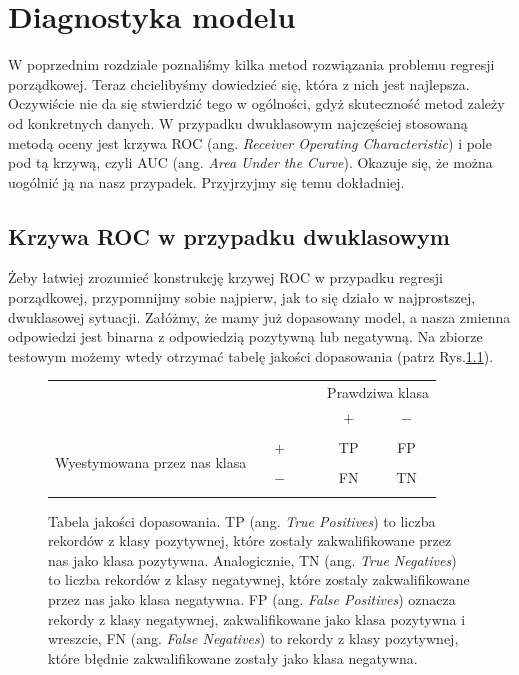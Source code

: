 \documentclass{mini}
\begin{document}

\chapter{Diagnostyka modelu}

W poprzednim rozdziale poznaliśmy kilka metod rozwiązania problemu regresji porządkowej. Teraz chcielibyśmy dowiedzieć się, która z nich jest najlepsza. Oczywiście nie da się stwierdzić tego w ogólności, gdyż skuteczność metod zależy od konkretnych danych. W przypadku dwuklasowym najczęściej stosowaną metodą oceny jest krzywa ROC (ang. \textit{Receiver Operating Characteristic}) i pole pod tą krzywą, czyli AUC (ang. \textit{Area Under the Curve}). Okazuje się, że można uogólnić ją na nasz przypadek. Przyjrzyjmy się temu dokładniej. 

\section{Krzywa ROC w przypadku dwuklasowym}


Żeby łatwiej zrozumieć konstrukcję krzywej ROC w przypadku regresji porządkowej, przypomnijmy sobie najpierw, jak to się działo w najprostszej, dwuklasowej sytuacji. Załóżmy, że mamy już dopasowany model, a nasza zmienna odpowiedzi jest binarna z odpowiedzią pozytywną lub negatywną. Na zbiorze testowym możemy wtedy otrzymać tabelę jakości dopasowania (patrz Rys.\ref{tabeladopasowania}).

\begin{figure}[h]
		\begin{Large}
		\begin{center}
		\begin{tabular}{c c c c | | c c c} 
			& & & & & \multicolumn{2}{c}{\Large Prawdziwa klasa}\\ 
			& & & & & $+$ & $-$ \\
			\hline
			\hline
			& & & & & & \\
			\multirow{3}{*}{\parbox{4cm}{\centering \Large Wyestymowana przez nas klasa}}
			& & $+$ & & & TP & FP\\
			& & & & &\\
			& & $-$ & & & FN & TN\\
			& & & & & &
		\end{tabular}
		\end{center}
		\end{Large}
	\caption{Tabela jakości dopasowania. TP (ang. \textit{True Positives}) to liczba rekordów z klasy pozytywnej, które zostały zakwalifikowane przez nas jako klasa pozytywna. Analogicznie, TN (ang. \textit{True Negatives}) to liczba rekordów z klasy negatywnej, które zostaly zakwalifikowane przez nas jako klasa negatywna. FP (ang. \textit{False Positives}) oznacza rekordy z klasy negatywnej, zakwalifikowane jako klasa pozytywna i wreszcie, FN (ang. \textit{False Negatives}) to rekordy z klasy pozytywnej, które błędnie zakwalifikowane zostały jako klasa negatywna.}
\label{tabeladopasowania}	
\end{figure}
\newpage
\vfill
\end{document}
